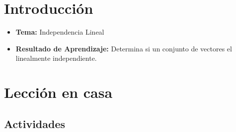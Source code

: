 \documentclass[a4,11pt]{aleph-notas}
\begin{document}
\encabezado

\section*{Introducción}

\begin{itemize}
    \item \textbf{Tema:} Independencia Lineal
    \item \textbf{Resultado de Aprendizaje:} Determina si un conjunto de vectores el linealmente independiente.
\end{itemize}

\section*{Lección en casa}

\subsection*{Actividades}
\end{document}
